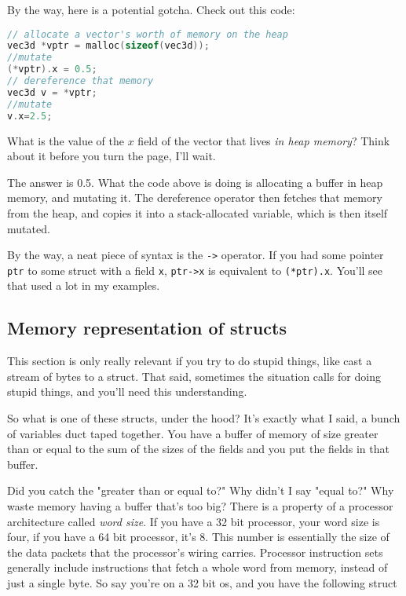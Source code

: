\documentclass[ebook,11pt,oneside,openany]{memoir}
\newcommand{\cf}[1]{\texttt{#1}}
\begin{document}
\noindent
By the way, here is a potential gotcha. Check out this code:

\begin{lstlisting}[language=C]
// allocate a vector's worth of memory on the heap
vec3d *vptr = malloc(sizeof(vec3d));
//mutate
(*vptr).x = 0.5;
// dereference that memory
vec3d v = *vptr;
//mutate
v.x=2.5;
\end{lstlisting}

What is the value of the $x$ field of the vector that lives \textit{in heap memory}? Think about it before you turn the page, I'll wait.
\pagebreak

The answer is 0.5. What the code above is doing is allocating a buffer in heap memory, and mutating it. The dereference operator then fetches that memory from the heap, and copies it into a stack-allocated variable, which is then itself mutated.

By the way, a neat piece of syntax is the \cf{->} operator. If you had some pointer \cf{ptr} to some struct with a field \cf{x}, \cf{ptr->x} is equivalent to \cf{(*ptr).x}. You'll see that used a lot in my examples.

\subsection{Memory representation of structs}

This section is only really relevant if you try to do stupid things, like cast a stream of bytes to a struct. That said, sometimes the situation calls for doing stupid things, and you'll need this understanding. 

So what is one of these structs, under the hood? It's exactly what I said, a bunch of variables duct taped together. You have a buffer of memory of size greater than or equal to the sum of the sizes of the fields and you put the fields in that buffer.

Did you catch the "greater than or equal to?" Why didn't I say "equal to?" Why waste memory having a buffer that's too big? There is a property of a processor architecture called \textit{word size}. If you have a 32 bit processor, your word size is four, if you have a 64 bit processor, it's 8. This number is essentially the size of the data packets that the processor's wiring carries. Processor instruction sets generally include instructions that fetch a whole word from memory, instead of just a single byte. So say you're on a 32 bit os, and you have the following struct
\end{document}
